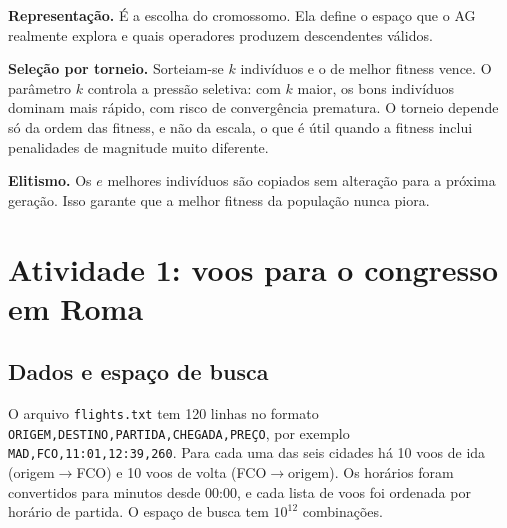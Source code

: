 \documentclass[conference]{IEEEtran}
\newcommand{\code}[1]{\texttt{#1}}
\begin{document}
\textbf{Representação.} É a escolha do cromossomo. Ela define o espaço que o AG realmente explora e quais operadores produzem descendentes válidos.

\textbf{Seleção por torneio.} Sorteiam-se $k$ indivíduos e o de melhor fitness vence. O parâmetro $k$ controla a pressão seletiva: com $k$ maior, os bons indivíduos dominam mais rápido, com risco de convergência prematura. O torneio depende só da ordem das fitness, e não da escala, o que é útil quando a fitness inclui penalidades de magnitude muito diferente.

\textbf{Elitismo.} Os $e$ melhores indivíduos são copiados sem alteração para a próxima geração. Isso garante que a melhor fitness da população nunca piora.

\section{Atividade 1: voos para o congresso em Roma}
\label{sec:a1}
\subsection{Dados e espaço de busca}
O arquivo \code{flights.txt} tem 120 linhas no formato \code{ORIGEM,DESTINO,PARTIDA,CHEGADA,PREÇO}, por exemplo \code{MAD,FCO,11:01,12:39,260}. Para cada uma das seis cidades há 10 voos de ida (origem$\to$FCO) e 10 voos de volta (FCO$\to$origem). Os horários foram convertidos para minutos desde 00:00, e cada lista de voos foi ordenada por horário de partida. O espaço de busca tem $10^{12}$ combinações.
\end{document}
